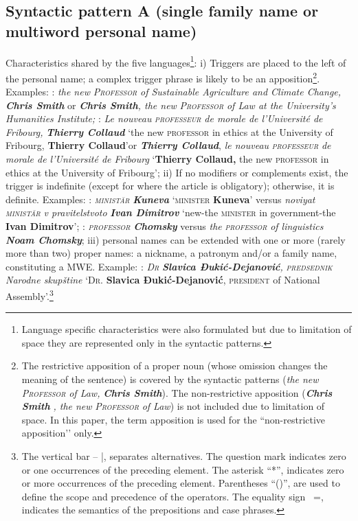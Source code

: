 \documentclass[output=paper]{langsci/langscibook}
\newcommand{\trigger}[1]{\textsc{#1}}
\begin{document}
\subsection{Syntactic pattern A (single family name or multiword personal name)}
Characteristics shared by the five
languages\footnote{
Language  specific characteristics
were also formulated but due to limitation of space they are
represented only in the syntactic patterns.}: i) Triggers are placed
to the left of the personal name; a complex trigger phrase is likely to
be an
apposition\footnote{The restrictive
apposition of a proper noun (whose omission changes the meaning of the
sentence) is covered by the syntactic patterns
(\textit{the new} \textit{\trigger{Professor}} 
\textit{of Law,} \textbf{\textit{Chris Smith}}). The non-restrictive
apposition (\textbf{\textit{Chris Smith}} \textit{, the new}
\textit{\trigger{Professor}} 
 \textit{of Law}) is not included due to
limitation of space. In this paper, the term apposition is used for the
``non-restrictive apposition’' only.}. Examples: : \textit{the new
}\textit{\trigger{Professor}} \textit{of Sustainable Agriculture and
Climate Change,} \textbf{\textit{Chris Smith}} or \textbf{\textit{Chris
Smith}}\textit{, the new }\textit{\trigger{Professor}} \textit{of Law at
the University's Humanities Institute;} : \textit{Le nouveau}\trigger{
}\textit{\trigger{professeur}} \textit{de morale de l’Université de
Fribourg,} \textbf{\textit{Thierry Collaud}} ‘the new \trigger{professor}
in ethics at the University of Fribourg, \textbf{Thierry Collaud}’or
\textbf{\textit{Thierry Collaud}}, \textit{le nouveau}\trigger{
}\textit{\trigger{professeur}} \textit{de morale de l’Université de
Fribourg }‘\textbf{Thierry Collaud,} the new \trigger{professor} in
ethics at the University of Fribourg’; ii) If no modifiers or
complements exist, the trigger is indefinite (except for  where
the article is obligatory); otherwise, it is definite. Examples: :
\textit{\trigger{ministăr}} \textbf{\textit{Kuneva }}‘\trigger{minister}
\textbf{Kuneva}’\textit{ }versus\textit{ noviyat}
\textit{\trigger{ministăr}} \textit{v pravitelstvoto}
\textbf{\textit{Ivan Dimitrov}} ‘new-the \trigger{minister} in
government-the \textbf{Ivan Dimitrov}’; : \textit{\trigger{professor}}
\textbf{\textit{Chomsky}} versus \textit{the
}\textit{\trigger{professor}} \textit{of linguistics
}\textbf{\textit{Noam Chomsky}}; iii) personal names can be extended
with one or more (rarely more than two) proper names: a nickname, a
patronym and/or a family name, constituting a MWE. Example: :
\textit{\trigger{Dr}} \textbf{\textit{Slavica Đukić-Dejanović}}\textit{,
}\textit{\trigger{predsednik}} \textit{Narodne skupštine} ‘\trigger{Dr.}
\textbf{Slavica Đukić-Dejanović}, \trigger{president} of National
Assembly’.\footnote{The vertical
bar – |, separates alternatives. The question mark indicates zero or
one occurrences of the preceding element. The asterisk  ``*'', indicates
zero or more occurrences of the preceding element. Parentheses ``()'',
are used to define the scope and precedence of the operators. The
equality sign \ =, indicates the semantics of the prepositions and case
phrases.}
  
\end{document}
